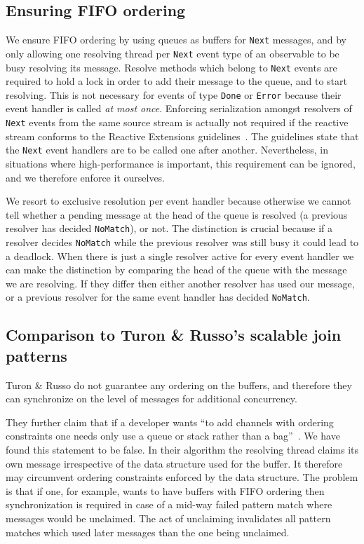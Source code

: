\documentclass[runningheads]{llncs}
\begin{document}
\begin{sloppypar}
\subsection{Ensuring FIFO ordering}

We ensure FIFO ordering by using queues as buffers for \texttt{Next} messages,
and by only allowing one resolving thread per \texttt{Next} event type of an
observable to be busy resolving its message. Resolve methods which belong to
\texttt{Next} events are required to hold a lock in order to add their message
to the queue, and to start resolving. This is not necessary for events of type
\texttt{Done} or \texttt{Error} because their event handler is called {\em at
most once}. Enforcing serialization amongst resolvers of \texttt{Next} events
from the same source stream is actually not required if the reactive stream
conforms to the Reactive Extensions guidelines~\cite{RxContract:2010}. The
guidelines state that the \texttt{Next} event handlers are to be called one
after another. Nevertheless, in situations where high-performance is
important, this requirement can be ignored, and we therefore enforce it
ourselves.

We resort to exclusive resolution per event handler because otherwise we cannot
tell whether a pending message at the head of the queue is resolved (a
previous resolver has decided \texttt{NoMatch}), or not. The distinction is
crucial because if a resolver decides \texttt{NoMatch} while the previous
resolver was still busy it could lead to a deadlock. When there is just a
single resolver active for every event handler we can make the distinction by
comparing the head of the queue with the message we are resolving. If they
differ then either another resolver has used our message, or a previous
resolver for the same event handler has decided \texttt{NoMatch}.


\subsection{Comparison to Turon \& Russo's scalable join patterns}

Turon \& Russo do not guarantee any ordering on the buffers, and therefore
they can synchronize on the level of messages for additional concurrency.

They further claim that if a developer wants ``to add channels with ordering
constraints one needs only use a queue or stack rather than a
bag''~\cite{Turon:2011}. We have found this statement to be false. In their
algorithm the resolving thread claims its own message irrespective of the
data structure used for the buffer. It therefore may circumvent ordering
constraints enforced by the data structure. The problem is that if one, for
example, wants to have buffers with FIFO ordering then synchronization is
required in case of a mid-way failed pattern match where messages would be
unclaimed. The act of unclaiming invalidates all pattern matches which used
later messages than the one being unclaimed.


\end{sloppypar}
\end{document}
